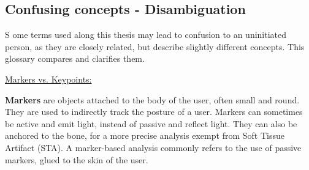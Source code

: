 
{} \mtcaddchapter
\label{Ann:gloss}

\vspace*{-1.6cm}
\begin{flushright}
\section*{\fontsize{20pt}{20pt}\selectfont\textnormal{Confusing concepts - Disambiguation}}
\end{flushright}
\vspace{-0.2cm}


\chead[\fancyplain{}{}]
      {\fancyplain{}{}}
\lfoot[\fancyplain{}{}]
      {\fancyplain{}{}}
\cfoot[\fancyplain{}{\thepage}]
      {\fancyplain{}{\thepage}}
\rfoot[\fancyplain{}{}]%
     {\fancyplain{}{\scriptsize}}


\lettrine[lines=1]{S}{ }ome terms used along this thesis may lead to confusion to an uninitiated person, as they are closely related, but describe slightly different concepts. This glossary compares and clarifies them.

\vspace*{1cm}

\noindent\underline{Markers vs. Keypoints:}

\textbf{Markers} are objects attached to the body of the user, often small and round. They are used to indirectly track the posture of a user. Markers can sometimes be active and emit light, instead of passive and reflect light. They can also be anchored to the bone, for a more precise analysis exempt from Soft Tissue Artifact (STA). A marker-based analysis commonly refers to the use of passive markers, glued to the skin of the user.

